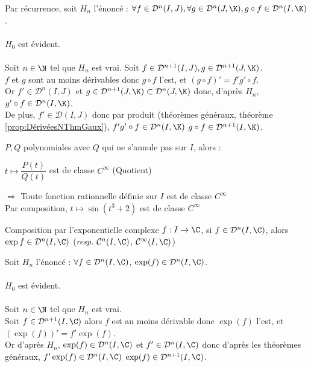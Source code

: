 \documentclass[12pt,a4paper]{report}
\begin{document}
\begin{demo}
Par récurrence, soit $H_n$ l'énoncé : $\forall f \in \mathcal{D}^n(I,J), \forall g \in \mathcal{D}^n(J,\K), g \circ f \in \mathcal{D}^n (I,\K)$. \\ \\
$H_0$ est évident. \\ \\
Soit $n \in \N$ tel que $H_n$ est vrai. Soit $f \in \mathcal{D}^{n+1}(I,J), g \in \mathcal{D}^{n+1}(J,\K)$. \\
$f$ et $g$ sont au moins dérivables donc $g \circ f$ l'est, et $(g \circ f)' = f' g' \circ f$. \\
Or $f' \in \mathcal{D}^n(I,J)$ et $g \in \mathcal{D}^{n+1}(J,\K) \subset \mathcal{D}^{n}(J,\K)$ donc, d'après $H_n$, $g' \circ f \in \mathcal{D}^n(I,\K)$. \\
De plus, $f' \in \mathcal{D}(I,J)$ donc par produit (théorèmes généraux, théorème \ref{prop:DérivéesNThmGaux}), $f' g' \circ f \in \mathcal{D}^n(I,\K)$ \ie $g \circ f \in \mathcal{D}^{n+1}(I,\K)$.
\end{demo}

\begin{exemple}
$P,Q$ polynomiales avec $Q$ qui ne s'annule pas sur $I$, alors :
\begin{center}
    $t \mapsto \dfrac{P(t)}{Q(t)}$ est de classe $C^\infty$ (Quotient)
\end{center}
$\Longrightarrow$ Toute fonction rationnelle définie sur $I$ est de classe $C^\infty$\\
Par composition, $t \mapsto \sin (t^3+2)$ est de classe $C^\infty$
\end{exemple}

\begin{theoreme}{Composition par l'exponentielle complexe}{}
$f:I \to \C$, si $f \in \mathcal{D}^n(I,\C)$, alors $\exp f \in \mathcal{D}^n(I,\C)$ (\textit{resp.} $\mathcal{C}^n(I,\C)$, $\mathcal{C}^\infty(I,\C)$)
\end{theoreme}

\begin{demo}
Soit $H_n$ l'énoncé : $\forall f \in \mathcal{D}^{n}(I,\C)$, $\exp(f) \in \mathcal{D}^{n}(I,\C)$. \\ \\
$H_0$ est évident. \\ \\
Soit $n \in \N$ tel que $H_n$ est vrai. \\
Soit $f \in \mathcal{D}^{n+1}(I,\C)$ alors $f$ est au moins dérivable donc $\exp(f)$ l'est, et $(\exp(f))' = f'\exp(f)$. \\
Or d'après $H_n$, $\exp(f) \in \mathcal{D}^{n}(I,\C)$ et $f' \in \mathcal{D}^{n}(I,\C)$ donc d'après les théorèmes généraux, $f' \exp(f) \in \mathcal{D}^{n}(I,\C)$ \ie $\exp(f) \in \mathcal{D}^{n+1}(I,\C)$.
\end{demo}
\end{document}

